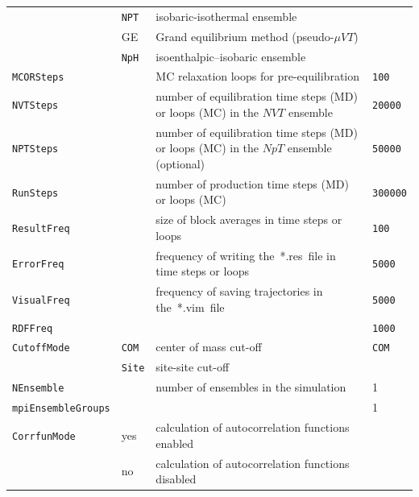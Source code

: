 \begin{landscape}
\begin{longtable}{llll}
		& \texttt{NPT}       & isobaric-isothermal ensemble                              &     \\
		\onehalfspacing            & GE        & Grand equilibrium method (pseudo-$\mu VT$)&     \\
		& \texttt{NpH}  	& isoenthalpic–isobaric ensemble & \\
		\hline
		\texttt{MCORSteps}                  &           & MC relaxation loops for pre-equilibration                 & \texttt{100} \\
		\texttt{NVTSteps}                   &           & number of equilibration time steps (MD) or loops (MC) in the $NVT$ ensemble             & \texttt{20000} \\
		\texttt{NPTSteps}                   &           & number of equilibration time steps (MD) or loops (MC) in the $NpT$ ensemble (optional)  & \texttt{50000} \\
		\onehalfspacing \texttt{RunSteps}   &           & number of production time steps (MD) or loops (MC)        & \texttt{300000} \\
		\midrule
		\texttt{ResultFreq}                 &           & size of block averages in time steps or loops             & \texttt{100} \\
		\texttt{ErrorFreq}                  &           & frequency of writing the~*.res~file in time steps or loops    & \texttt{5000} \\
		\texttt{VisualFreq} &           & frequency of saving trajectories in the~*.vim~file& \texttt{5000} \\
		\onehalfspacing \texttt{RDFFreq} & & & \texttt{1000} \\
		\midrule
		\texttt{CutoffMode}                 & \texttt{COM}       & center of mass cut-off                                    & \texttt{COM} \\
		\onehalfspacing            & \texttt{Site}      & site-site cut-off                                         & \\
		\texttt{NEnsemble}  &           & number of ensembles in the simulation                     & 1 \\
		\onehalfspacing \texttt{mpiEnsembleGroups} & & &1\\
		\midrule
		\texttt{CorrfunMode}                & yes       & calculation of autocorrelation functions enabled          &  \\
		\onehalfspacing            & no        & calculation of autocorrelation functions disabled         &  \\
		

\end{longtable}
\end{landscape}
